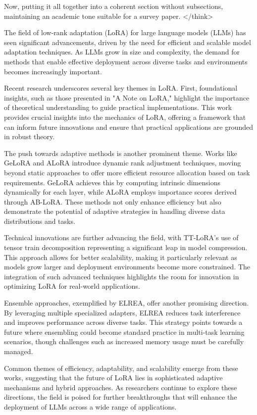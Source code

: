 \documentclass[conference]{IEEEtran}
\begin{document}
Now, putting it all together into a coherent section without subsections, maintaining an academic tone suitable for a survey paper.
</think>

The field of low-rank adaptation (LoRA) for large language models (LLMs) has seen significant advancements, driven by the need for efficient and scalable model adaptation techniques. As LLMs grow in size and complexity, the demand for methods that enable effective deployment across diverse tasks and environments becomes increasingly important.

Recent research underscores several key themes in LoRA. First, foundational insights, such as those presented in "A Note on LoRA," highlight the importance of theoretical understanding to guide practical implementations. This work provides crucial insights into the mechanics of LoRA, offering a framework that can inform future innovations and ensure that practical applications are grounded in robust theory.

The push towards adaptive methods is another prominent theme. Works like GeLoRA and ALoRA introduce dynamic rank adjustment techniques, moving beyond static approaches to offer more efficient resource allocation based on task requirements. GeLoRA achieves this by computing intrinsic dimensions dynamically for each layer, while ALoRA employs importance scores derived through AB-LoRA. These methods not only enhance efficiency but also demonstrate the potential of adaptive strategies in handling diverse data distributions and tasks.

Technical innovations are further advancing the field, with TT-LoRA's use of tensor train decomposition representing a significant leap in model compression. This approach allows for better scalability, making it particularly relevant as models grow larger and deployment environments become more constrained. The integration of such advanced techniques highlights the room for innovation in optimizing LoRA for real-world applications.

Ensemble approaches, exemplified by ELREA, offer another promising direction. By leveraging multiple specialized adapters, ELREA reduces task interference and improves performance across diverse tasks. This strategy points towards a future where ensembling could become standard practice in multi-task learning scenarios, though challenges such as increased memory usage must be carefully managed.

Common themes of efficiency, adaptability, and scalability emerge from these works, suggesting that the future of LoRA lies in sophisticated adaptive mechanisms and hybrid approaches. As researchers continue to explore these directions, the field is poised for further breakthroughs that will enhance the deployment of LLMs across a wide range of applications.
\end{document}
